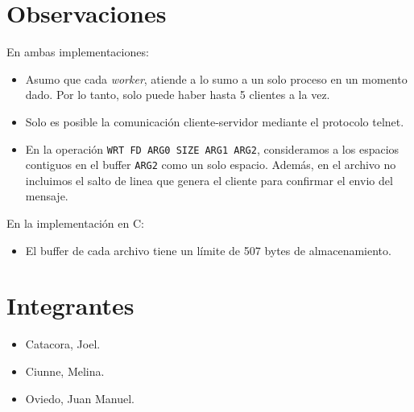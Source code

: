 \documentclass[a4paper, 8pt]{article}
\begin{document}
\section{Observaciones}

En ambas implementaciones:

\begin{itemize}

% 
  \item Asumo que cada \textit{worker}, atiende a lo sumo a un solo proceso en un momento dado. Por lo tanto, solo puede haber
  hasta 5 clientes a la vez.

  \item Solo es posible la comunicación cliente-servidor mediante el protocolo telnet.
  
  \item En la operación \texttt{WRT FD ARG0 SIZE ARG1 ARG2}, consideramos a los espacios contiguos en el buffer \texttt{ARG2}
  como un solo espacio. Además, en el archivo no incluimos el salto de linea que genera el cliente para confirmar el envio del mensaje.
  
\end{itemize}

En la implementación en C:

\begin{itemize}
  \item El buffer de cada archivo tiene un límite de 507 bytes de almacenamiento.
  
\end{itemize}

\section{Integrantes}
\begin{itemize}
  \item Catacora, Joel.
  \item Ciunne, Melina.
  \item Oviedo, Juan Manuel.
\end{itemize}
\end{document}
